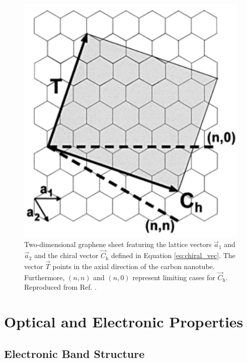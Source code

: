 \begin{figure}[ht]
	\centering
	\includegraphics[scale=1]{images/chapter_optical_props/chiral_vectors_sheet.png}
	\caption{Two-dimensional graphene sheet featuring the lattice vectors $\vec{a}_1$ and $\vec{a}_2$ and the chiral vector $\vec{C}_\text{h}$ defined in Equation \eqref{eq:chiral_vec}. The vector $\vec{T}$ points in the axial direction of the carbon nanotube. Furthermore, $(n,n)$ and $(n,0)$ represent limiting cases for $\vec{C}_\text{h}$. Reproduced from Ref. \cite{odom2000structure}.}
	\label{fig:chiral_vectors}
\end{figure}


\section{Optical and Electronic Properties}

\subsection{Electronic Band Structure}

